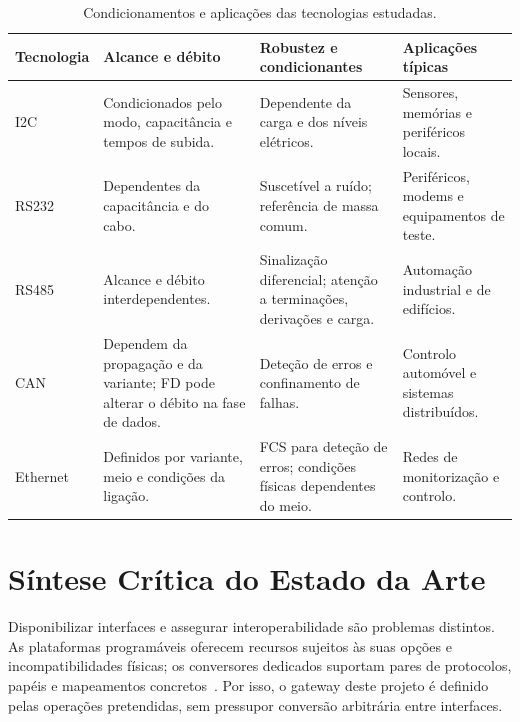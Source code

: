 \begin{table}[htbp]
    \centering
    \small
    \setlength{\tabcolsep}{4pt}
    \renewcommand{\arraystretch}{1.12}
    \caption{Condicionamentos e aplicações das tecnologias estudadas.}
    \label{tab:comparacao-condicoes}
    \begin{tabularx}{\textwidth}{@{}>{\raggedright\arraybackslash}p{}*{3}{>{\raggedright\arraybackslash}X}@{}}
        \toprule
\rowcolor{LasetTint}
        Tecnologia & Alcance e débito & Robustez e condicionantes & Aplicações típicas \\
        \midrule
        I2C~\cite{nxp_um10204_2021}
        & Condicionados pelo modo, capacitância e tempos de subida.
        & Dependente da carga e dos níveis elétricos.
        & Sensores, memórias e periféricos locais. \\
        \addlinespace
        RS232~\cite{ti_rs232_2002,dodson_rs232_2023}
        & Dependentes da capacitância e do cabo.
        & Suscetível a ruído; referência de massa comum.
        & Periféricos, modems e equipamentos de teste. \\
        \addlinespace
        RS485~\cite{ti_rs485_an1057_2013,stiller_rs485_2015}
        & Alcance e débito interdependentes.
        & Sinalização diferencial; atenção a terminações, derivações
        e carga.
        & Automação industrial e de edifícios. \\
        \addlinespace
        CAN~\cite{cia_can_hs,cia_can_cc,cia_can_fd}
        & Dependem da propagação e da variante; FD pode alterar
        o débito na fase de dados.
        & Deteção de erros e confinamento de falhas.
        & Controlo automóvel e sistemas distribuídos. \\
        \addlinespace
        Ethernet~\cite{ieee_8023_2018,simmons_ethernet_2008}
        & Definidos por variante, meio e condições da ligação.
        & FCS para deteção de erros; condições físicas dependentes do meio.
        & Redes de monitorização e controlo. \\
        \bottomrule
    \end{tabularx}
\end{table}

\section{Síntese Crítica do Estado da Arte}
\label{sec:sintese-estado-arte}

Disponibilizar interfaces e assegurar interoperabilidade são problemas
distintos. As plataformas programáveis oferecem recursos sujeitos às
suas opções e incompatibilidades físicas; os conversores dedicados
suportam pares de protocolos, papéis e mapeamentos
concretos~\cite{compulab_imx7_manual_2018,moxa_mgate5105,hms_ab7838}.
Por isso, o gateway deste projeto é definido pelas operações pretendidas,
sem pressupor conversão arbitrária entre interfaces.

